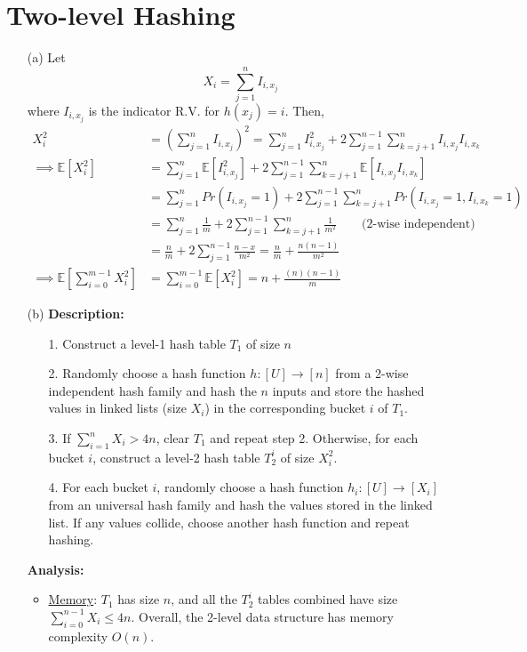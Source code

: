 \documentclass[11pt]{article}
\theoremstyle{definition}
\theoremstyle{remark}
\begin{document}
\section{Two-level Hashing}
\begin{enumerate}
\item[(a)] Let
\[
X_i = \sum_{j=1}^n I_{i,x_j}
\]
where $I_{i, x_j}$ is the indicator R.V. for $h(x_j) = i$. Then,
\begin{align*}
X_i^2 &= \left(\sum_{j=1}^n I_{i,x_j}\right)^2 = \sum_{j=1}^n I_{i, x_j}^2 + 2 \sum_{j=1}^{n-1} \sum_{k=j+1}^n I_{i,x_j} I_{i, x_k} \\
\implies \mathbb{E}[X_i^2] &= \sum_{j=1}^n \mathbb{E}[I_{i, x_j}^2] + 2 \sum_{j=1}^{n-1} \sum_{k=j+1}^n \mathbb{E}[I_{i,x_j} I_{i, x_k}] \\
&= \sum_{j=1}^n Pr(I_{i,x_j}=1) + 2 \sum_{j=1}^{n-1} \sum_{k=j+1}^n Pr(I_{i,x_j}=1, I_{i, x_k}=1) \\
&= \sum_{j=1}^n \frac{1}{m} + 2 \sum_{j=1}^{n-1} \sum_{k=j+1}^n \frac{1}{m^2} \qquad \text{(2-wise independent)} \\
&= \frac{n}{m} + 2 \sum_{j=1}^{n-1} \frac{n-x}{m^2} = \frac{n}{m} + \frac{n(n-1)}{m^2} \\
\implies \mathbb{E}\left[\sum_{i=0}^{m-1} X_i^2\right] &= \sum_{i=0}^{m-1} \mathbb{E}[X_i^2] = n + \frac{(n)(n-1)}{m}
\end{align*}
\clearpage

\item[(b)]
\textbf{Description:}\\
\begin{enumerate}
\item[1.] Construct a level-1 hash table $T_1$ of size $n$
\item[2.] Randomly choose a hash function $h:[U]\to[n]$ from a 2-wise independent hash family and hash the $n$ inputs and store the hashed values in linked lists (size $X_i$) in the corresponding bucket $i$ of $T_1$.
\item[3.] If $\sum_{i=1}^{n} X_i > 4n$, clear $T_1$ and repeat step 2. Otherwise, for each bucket $i$, construct a level-2 hash table $T_2^i$ of size $X_i^2$.
\item[4.] For each bucket $i$, randomly choose a hash function $h_i : [U] \to [X_i]$ from an universal hash family and hash the values stored in the linked list. If any values collide, choose another hash function and repeat hashing.
\end{enumerate}

\textbf{Analysis:}\\
\begin{itemize}
\item \underline{Memory}: $T_1$ has size $n$, and all the $T_2^i$ tables combined have size $\sum_{i=0}^{n-1} X_i \leq 4n$. Overall, the 2-level data structure has memory complexity $O(n)$.


\end{itemize}
\end{enumerate}
\end{document}
